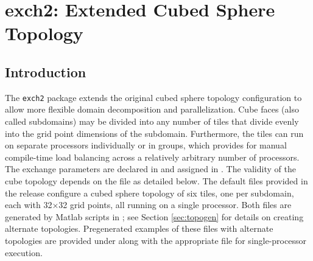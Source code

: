 


\section{exch2: Extended Cubed Sphere \mbox{Topology}}
\label{sec:exch2}


\subsection{Introduction}

The \texttt{exch2} package extends the original cubed sphere topology
configuration to allow more flexible domain decomposition and
parallelization.  Cube faces (also called subdomains) may be divided
into any number of tiles that divide evenly into the grid point
dimensions of the subdomain.  Furthermore, the tiles can run on
separate processors individually or in groups, which provides for
manual compile-time load balancing across a relatively arbitrary
number of processors. \\

The exchange parameters are declared in
and assigned in
. The
validity of the cube topology depends on the  file as
detailed below.  The default files provided in the release configure a
cubed sphere topology of six tiles, one per subdomain, each with
32$\times$32 grid points, all running on a single processor.  Both
files are generated by Matlab scripts in
; see Section
\ref{sec:topogen} 
for details on creating alternate topologies.  Pregenerated examples
of these files with alternate topologies are provided under
 along with the appropriate 
file for single-processor execution.

